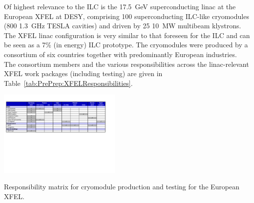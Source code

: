\documentclass[%
 reprint,
 amsmath,amssymb,
 aps,
]{revtex4-1}
\begin{document}
Of highest relevance to the ILC is the 17.5~GeV superconducting linac at the European XFEL at DESY, comprising 100 superconducting ILC-like cryomodules (800 1.3~GHz TESLA cavities) and driven by 25 10~MW multibeam klystrons. The XFEL 
linac configuration is very similar to that foreseen for the ILC and can be 
seen as a 7\% (in energy) ILC prototype. The cryomodules were produced by a 
consortium of six countries together with predominantly European industries. The consortium members and the various responsibilities across the linac-relevant XFEL work packages (including testing) are given in Table~\ref{tab:PrePrep:XFELResponsibilities}.

\begin{table}[htbp]
\begin{center}
\includegraphics[width=0.45\textwidth]{figures/ILCEAP-Matrices-XFEL.pdf}
\caption{\label{tab:PrePrep:XFELResponsibilities} Responsibility matrix for cryomodule production and testing for the European XFEL.} 
\end{center}
\end{table}
\end{document}
